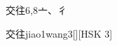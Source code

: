 \begin{entry}{交往}{6,8}{⼇、⼻}
  \begin{phonetics}{交往}{jiao1wang3}[][HSK 3]
  \end{phonetics}
\end{entry}
